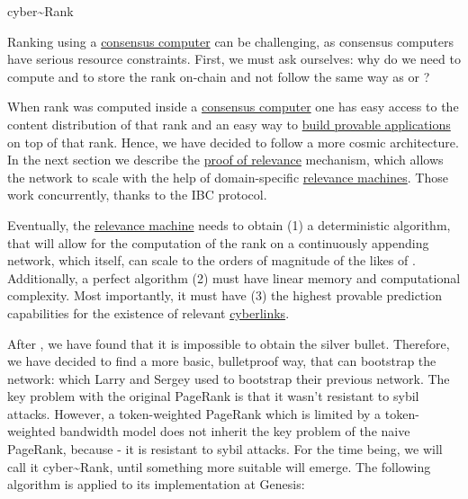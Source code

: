 \documentclass[8pt,oneside]{amsart}
\makeatletter
\newcommand{\linkred}[2]{\href{#1}{\color{red}{#2}}}
\newcommand{\linkgreen}[2]{\href{#1}{\color{green}{#2}}}
\renewcommand\subsection{\@startsection{subsection}
                                    {2}{\z@}
                                    {-3.25ex\@plus -1ex \@minus -.2ex}
                                    {0ex \@plus .2ex}
                                    {\play\Large}
                        }
\newcommand{\titleSection}[1]{\subsection{#1}}
\makeatother
\begin{document}
\titleSection{cyber\~{}Rank}\label{cyber-rank}

Ranking using a {\hyperref[consensus-computer]{consensus computer}} can be challenging, as consensus computers have serious resource constraints. First, we must ask ourselves: why do we need to compute and to store the rank on-chain and not follow the same way as \linkgreen{https://ipfs.io/ipfs/QmZo7eY5UdJYotf3Z9GNVBGLjkCnE1j2fMdW2PgGCmvGPj}{Colony} or \linkgreen{https://ipfs.io/ipfs/QmTrxXp2xhB2zWGxhNoLgsztevqKLwpy5HwKjLjzFa7rnD}{Truebit}?

When rank was computed inside a {\hyperref[consensus-computer]{consensus computer}} one has easy access to the content distribution of that rank and an easy way to {\hyperref[apps]{build provable applications}} on top of that rank. Hence, we have decided to follow a more cosmic architecture. In the next section we describe the {\hyperref[proof-of-relevance]{proof of relevance}} mechanism, which allows the network to scale with the help of domain-specific {\hyperref[relevance-machine]{relevance machines}}. Those work concurrently, thanks to the IBC protocol.

Eventually, the {\hyperref[relevance-machine]{relevance machine}} needs to obtain (1) a deterministic algorithm, that will allow for the computation of the rank on a continuously appending network, which itself, can scale to the orders of magnitude of the likes of \linkred{https://google.com}{Google}. Additionally, a perfect algorithm (2) must have linear memory and computational complexity. Most importantly, it must have (3) the highest provable prediction capabilities for the existence of relevant {\hyperref[cyberlinks]{cyberlinks}}.

After \linkgreen{https://ipfs.io/ipfs/QmTJPJ55ePgR2MS1HoAtyqS1mteVLXUjAS4H8W97EEopxC}{thorough research}, we have found that it is impossible to obtain the silver bullet. Therefore, we have decided to find a more basic, bulletproof way, that can bootstrap the network: \linkgreen{http://ipfs.io/ipfs/QmbuE2Pfcsiji1g9kzmmsCnptqPEn3BuN3BhnZHrPVsiVw}{the rank} which Larry and Sergey used to bootstrap their previous network. The key problem with the original PageRank is that it wasn't resistant to sybil attacks. However, a token-weighted PageRank which is limited by a token-weighted bandwidth model does not inherit the key problem of the naive PageRank, because - it is resistant to sybil attacks. For the time being, we will call it cyber\~{}Rank, until something more suitable will emerge. The following algorithm is applied to its implementation at Genesis:
\end{document}

